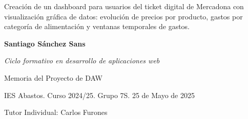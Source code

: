 \documentclass[a4paper,12pt]{report}
\begin{document}
	
	

	
	
	
	\begin{titlepage}
		\begin{center}

			
			\vspace*{5cm} 

			\LARGE{Creación de un dashboard para usuarios del ticket digital de Mercadona con visualización gráfica de datos: evolución de precios por producto, gastos por categoría de alimentación y ventanas temporales de gastos.}
			
			\vfill
			
		\begin{flushright}
			\large{\textbf{Santiago Sánchez Sans}}
			
			\large{\textit{Ciclo formativo en desarrollo de aplicaciones web}}
			
			\large{Memoria del Proyecto de DAW}
			
			\large{IES Abastos. Curso 2024/25. Grupo 7S. 25 de Mayo de 2025}
			
			\large{Tutor Individual: Carlos Furones}
		\end{flushright}

			
			
			
			
		\end{center}
	\end{titlepage}
	
	
	
	
	
	
	
	
	
\end{document}
